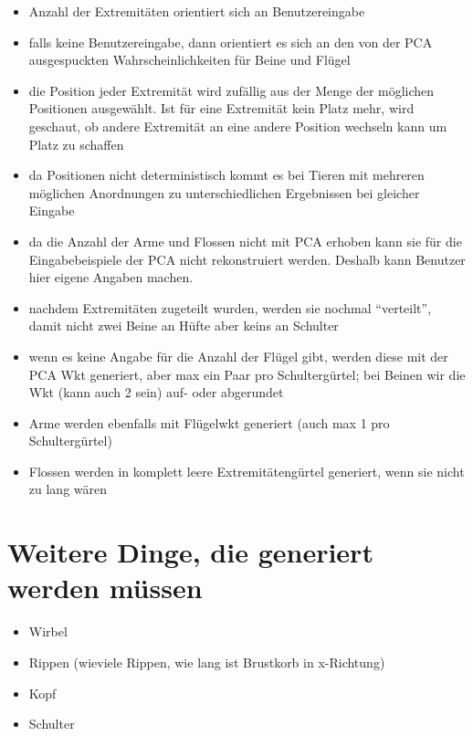 \begin{itemize}
 \item Anzahl der Extremitäten orientiert sich an Benutzereingabe
 \item falls keine Benutzereingabe, dann orientiert es sich an den von der PCA ausgespuckten Wahrscheinlichkeiten für Beine und Flügel
 \item die Position jeder Extremität wird zufällig aus der Menge der möglichen Positionen ausgewählt. Ist für eine Extremität kein Platz mehr, wird geschaut, ob andere Extremität an eine andere Position wechseln kann um Platz zu schaffen
 \item da Positionen nicht deterministisch kommt es bei Tieren mit mehreren möglichen Anordnungen zu unterschiedlichen Ergebnissen bei gleicher Eingabe
 \item da die Anzahl der Arme und Flossen nicht mit PCA erhoben kann sie für die Eingabebeispiele der PCA nicht rekonstruiert werden. Deshalb kann Benutzer hier eigene Angaben machen.
 \item nachdem Extremitäten zugeteilt wurden, werden sie nochmal "`verteilt"', damit nicht \zb zwei Beine an Hüfte aber keins an Schulter 
 \item wenn es keine Angabe für die Anzahl der Flügel gibt, werden diese mit der PCA Wkt generiert, aber max ein Paar pro Schultergürtel; bei Beinen wir die Wkt (kann auch 2 sein) auf- oder abgerundet
 \item Arme werden ebenfalls mit Flügelwkt generiert (auch max 1 pro Schultergürtel)
 \item Flossen werden in komplett leere Extremitätengürtel generiert, wenn sie nicht zu lang wären
\end{itemize}


\section{Weitere Dinge, die generiert werden müssen}

\begin{itemize}
 \item Wirbel
 \item Rippen (wieviele Rippen, wie lang ist Brustkorb in x-Richtung)
 \item Kopf
 \item Schulter 
\end{itemize}
